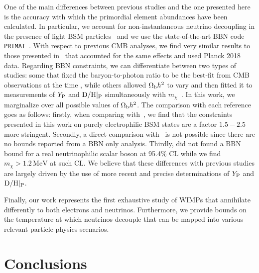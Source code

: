 \documentclass[notitlepage,letterpaper,natbib,aps,prd,onecolumn,amsmath,amsfonts,nofootinbib,preprintnumbers,superscriptaddress,secnumarabic,groupedaddress]{revtex4-1}
\begin{document}
One of the main differences between previous studies and the one presented here is the accuracy with which the primordial element abundances have been calculated. In particular, we account for non-instantaneous neutrino decoupling in the presence of light BSM particles~\cite{Escudero:2018mvt,Escudero:2019new} and we use the state-of-the-art BBN code \texttt{PRIMAT}~\cite{Pitrou:2018cgg}. With respect to previous CMB analyses, we find very similar results to those presented in~\cite{Escudero:2018mvt} that accounted for the same effects and used Planck 2018 data. Regarding BBN constraints, we can differentiate between two types of studies: some that fixed the baryon-to-photon ratio to be the best-fit from CMB observations at the time \cite{Serpico:2004nm,Boehm:2013jpa,Boehm:2012gr,Depta:2019lbe}, while others allowed $\Omega_{\rm b}h^2$ to vary and then fitted it to measurements of $Y_{\rm P}$ and ${\rm D/H}|_{\rm P}$ simultaneously with $m_\chi$~\cite{Nollett:2013pwa,Nollett:2014lwa,Wilkinson:2016gsy}. In this work, we marginalize over all possible values of $\Omega_{\rm b}h^2$. The comparison with each reference goes as follows: firstly, when comparing with~\cite{Nollett:2013pwa}, we find that the constraints presented in this work on purely electrophilic BSM states are a factor $1.5-2.5$ more stringent. Secondly, a direct comparison with~\cite{Nollett:2014lwa} is not possible since there are no bounds reported from a BBN only analysis. Thirdly, \cite{Wilkinson:2016gsy} did not found a BBN bound for a real neutrinophilic scalar boson at 95.4\% CL while we find $m_\chi > 1.2\,\text{MeV}$ at such CL. We believe that these differences with previous studies are largely driven by the use of more recent and precise determinations of $Y_{\rm P}$ and ${\rm D/H}|_{\rm P}$. 

Finally, our work represents the first exhaustive study of WIMPs that annihilate differently to both electrons and neutrinos. Furthermore, we provide bounds on the temperature at which neutrinos decouple that can be mapped into various relevant particle physics scenarios. 


\section{Conclusions}\label{sec:conclusions}
\end{document}
